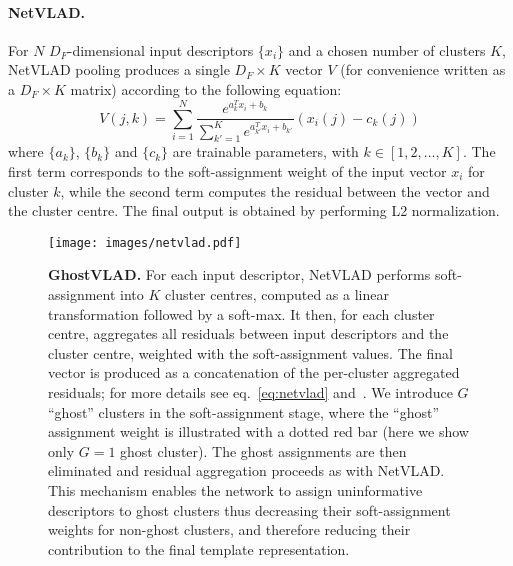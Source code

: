 \documentclass[runningheads]{llncs}
\begin{document}
\paragraph{NetVLAD.}
For $N$ $D_F$-dimensional input descriptors $\{x_i\}$ and
a chosen number of clusters $K$, NetVLAD pooling produces a single $D_F \times K$
vector $V$ (for convenience written as a $D_F \times K$ matrix) according
to the following equation:
\begin{equation}
V(j,k) = \sum_{i=1}^{N} \frac{e^{a_k^Tx_i + b_k}}{\sum_{k'=1}^{K}{e^{a_{k'}^Tx_i + b_{k'}}}} (x_i(j) - c_k(j))
\label{eq:netvlad}
\end{equation}
where $\{a_k\}$, $\{b_k\}$ and $\{c_k\}$ are trainable parameters, with $k \in [1, 2, \dots, K]$.
The first term corresponds to the soft-assignment weight
of the input vector $x_i$ for cluster $k$,
while the second term computes the residual between the vector and
the cluster centre.
The final output is obtained by performing L2 normalization.



\begin{figure}[t]
   \begin{center}
         \texttt{[image: images/netvlad.pdf]}
   \end{center}
\caption{\textbf{GhostVLAD.}
For each input descriptor, NetVLAD performs soft-assignment
into $K$ cluster centres, computed as a linear transformation
followed by a soft-max.
It then, for each cluster centre, aggregates all residuals 
between input descriptors and the cluster centre,
weighted with the soft-assignment values.
The final vector is produced as a concatenation of the per-cluster
aggregated residuals;
for more details see eq.~\ref{eq:netvlad} and~\cite{Arandjelovic16}.
We introduce $G$ ``ghost'' clusters in the soft-assignment stage,
where the ``ghost'' assignment weight is illustrated
with a dotted red bar (here we show only $G=1$ ghost cluster).
The ghost assignments are then eliminated and residual aggregation
proceeds as with NetVLAD.
This mechanism enables the network to assign uninformative descriptors
to ghost clusters thus decreasing their soft-assignment weights
for non-ghost clusters, and therefore reducing their contribution
to the final template representation.
   }
    \label{fig:ghost}
\end{figure}
\end{document}
